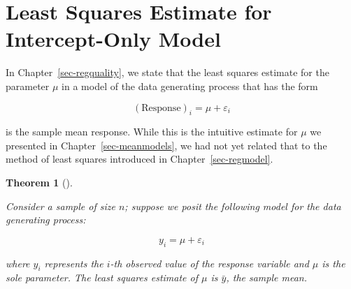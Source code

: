\documentclass[
  letterpaper,
  DIV=11,
  numbers=noendperiod]{scrreprt}
\theoremstyle{definition}
\theoremstyle{definition}
\theoremstyle{plain}
\newtheorem{theorem}{Theorem}[chapter]
\theoremstyle{remark}
\begin{document}
\section{Least Squares Estimate for Intercept-Only
Model}\label{least-squares-estimate-for-intercept-only-model}

In Chapter~\ref{sec-regquality}, we state that the least squares
estimate for the parameter \(\mu\) in a model of the data generating
process that has the form

\[(\text{Response})_i = \mu + \varepsilon_i\]

is the sample mean response. While this is the intuitive estimate for
\(\mu\) we presented in Chapter~\ref{sec-meanmodels}, we had not yet
related that to the method of least squares introduced in
Chapter~\ref{sec-regmodel}.

\begin{theorem}[]\protect\hypertarget{thm-app-teststat-ls-one}{}\label{thm-app-teststat-ls-one}

Consider a sample of size \(n\); suppose we posit the following model
for the data generating process:

\[y_i = \mu + \varepsilon_i\]

where \(y_i\) represents the \(i\)-th observed value of the response
variable and \(\mu\) is the sole parameter. The least squares estimate
of \(\mu\) is \(\bar{y}\), the sample mean.

\end{theorem}
\end{document}

